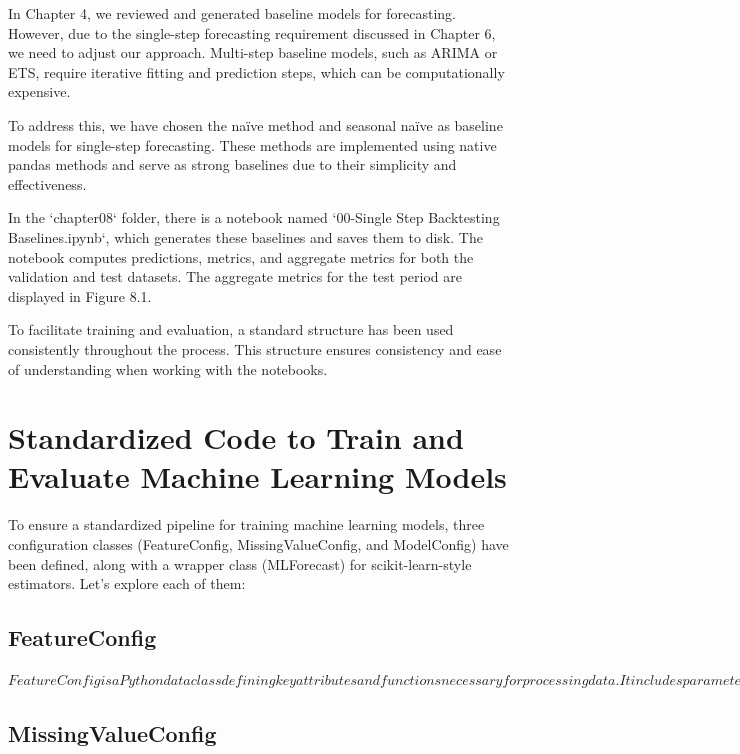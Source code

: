 \documentclass{article}
\begin{document}
In Chapter 4, we reviewed and generated baseline models for forecasting. However, due to the single-step forecasting requirement discussed in Chapter 6, we need to adjust our approach. Multi-step baseline models, such as ARIMA or ETS, require iterative fitting and prediction steps, which can be computationally expensive.

To address this, we have chosen the naïve method and seasonal naïve as baseline models for single-step forecasting. These methods are implemented using native pandas methods and serve as strong baselines due to their simplicity and effectiveness.

In the `chapter08` folder, there is a notebook named `00-Single Step Backtesting Baselines.ipynb`, which generates these baselines and saves them to disk. The notebook computes predictions, metrics, and aggregate metrics for both the validation and test datasets. The aggregate metrics for the test period are displayed in Figure 8.1.

To facilitate training and evaluation, a standard structure has been used consistently throughout the process. This structure ensures consistency and ease of understanding when working with the notebooks.

\section{Standardized Code to Train and Evaluate Machine Learning Models}

To ensure a standardized pipeline for training machine learning models, three configuration classes (FeatureConfig, MissingValueConfig, and ModelConfig) have been defined, along with a wrapper class (MLForecast) for scikit-learn-style estimators. Let's explore each of them:

\subsection{FeatureConfig}

$FeatureConfig is a Python dataclass defining key attributes and functions necessary for processing data. It includes parameters such as date, target, continuous_features, categorical_features, boolean_features, index_cols, and exogenous_features. Additionally, it provides a method called \texttt{get\_X\_y} to retrieve features and targets from a data frame.$

\subsection{MissingValueConfig}
\end{document}
